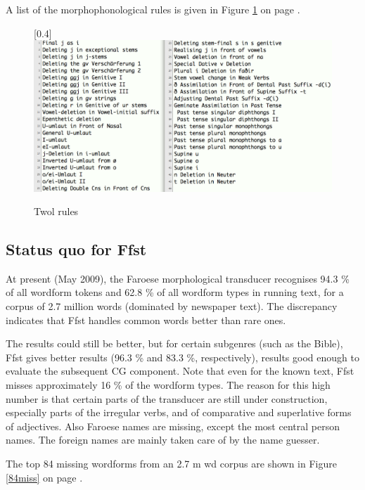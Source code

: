 \documentclass[11pt]{article}
\begin{document}
A list of the morphophonological rules is given in Figure \ref{twolrules} on page \pageref{twolrules}.

\begin{figure}[htbp]
\begin{center}
\scalebox{0.4}[0.4]{\includegraphics{img/twolrules.png}}
\caption{Twol rules}
\label{twolrules}
\end{center}
\end{figure}



\subsection{Status quo for Ffst}


At present (May 2009), the Faroese morphological transducer recognises 94.3 \% of all wordform tokens and 62.8 \% of all wordform types in running text, for a corpus of 2.7 million words (dominated by newspaper text). The discrepancy indicates that Ffst handles common words better than rare ones. 

The results could still be better, but for certain subgenres (such as the Bible), Ffst gives better results (96.3 \% and 83.3 \%, respectively), results good enough to evaluate the subsequent CG component. Note that even for the known text, Ffst misses approximately 16 \% of the wordform types. The reason for this high number is that certain parts of the transducer are still under construction, especially parts of the irregular verbs, and of comparative and superlative forms of adjectives. Also Faroese names are missing, except the most central person names. The foreign names are mainly taken care of by the name guesser.

The top 84 missing wordforms from an 2.7 m wd corpus are shown in Figure \ref{84miss} on page \pageref{84miss}. 
\end{document}
